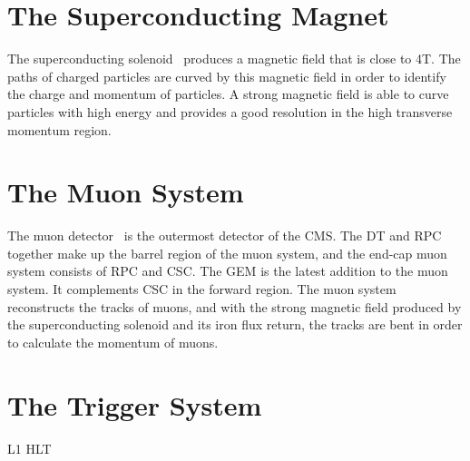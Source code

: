 \section{The Superconducting Magnet}
\label{sec:Magnet}

The superconducting solenoid~\cite{CMS:1997moj} produces a magnetic field that is close to 4T. The paths of charged particles are curved by this magnetic field in order to identify the charge and momentum of particles. A strong magnetic field is able to curve particles with high energy and provides a good resolution in the high transverse momentum region.

\section{The Muon System}
\label{sec:MuonSys}

The muon detector~\cite{CMS:1997iti} is the outermost detector of the CMS. The \ac{DT} and \ac{RPC} together make up the barrel region of the muon system, and the end-cap muon system consists of \ac{RPC} and  \ac{CSC}. The \ac{GEM} is the latest addition to the muon system. It complements \ac{CSC} in the forward region. The muon system reconstructs the tracks of muons, and with the strong magnetic field produced by the superconducting solenoid and its iron flux return, the tracks are bent in order to calculate the momentum of muons.

\section{The Trigger System}
\label{sec:TrigSys}

\ac{L1} \ac{HLT} 